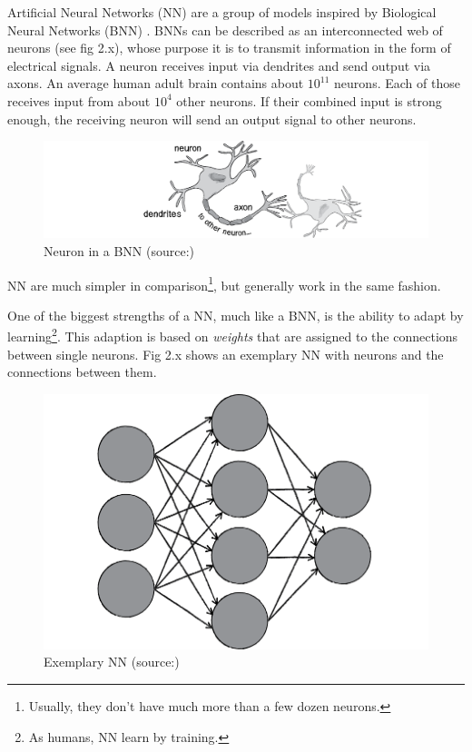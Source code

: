 Artificial Neural Networks (NN) are a group of models inspired by Biological Neural Networks (BNN) . BNNs can be described as an interconnected web of neurons (see fig 2.x), whose purpose it is to transmit information in the form of electrical signals. A neuron receives input via dendrites and send output via axons\cite{Shiffman12}. An average human adult brain contains about $10^{11}$ neurons. Each of those receives input from about $10^4$ other neurons. If their combined input is strong enough, the receiving neuron will send an output signal to other neurons\cite{Bourg04}.

\begin{figure}[H]
	\begin{center}
		\includegraphics[scale=0.7]{img/bnn.png}
		\caption{Neuron in a BNN (source:\cite{Shiffman12})}
		\label{fig:fig2.2}
	\end{center}
\end{figure}

NN are much simpler in comparison\footnote{Usually, they don't have much more than a few dozen neurons\cite{Bourg04}.}, but generally work in the same fashion.

One of the biggest strengths of a NN, much like a BNN, is the ability to adapt by learning\footnote{As humans, NN learn by training\cite{Shiffman12}.}. This adaption is based on \emph{weights} that are assigned to the connections between single neurons. Fig 2.x shows an exemplary NN with neurons and the connections between them.

\begin{figure}[H]
	\begin{center}
		\includegraphics[scale=1.0]{img/NN.png}
		\caption{Exemplary NN (source:\cite{Shiffman12})}
		\label{fig:fig2.3}
	\end{center}
\end{figure}

